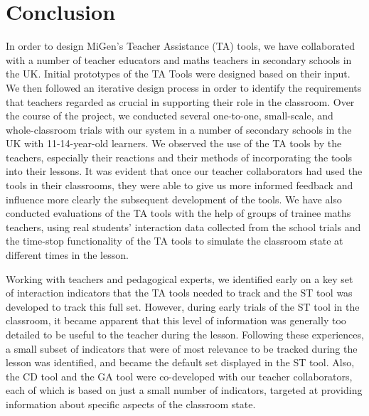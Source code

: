 \section{Conclusion}
\label{sec:conclusion}

In order to design MiGen’s Teacher Assistance (TA) tools, we have
collaborated with a number of teacher educators and maths teachers in
secondary schools in the UK. Initial prototypes of the TA Tools were
designed based on their input. We then followed an iterative design
process in order to identify the requirements that teachers regarded
as crucial in supporting their role in the classroom. Over the course
of the project, we conducted several one-to-one, small-scale, and
whole-classroom trials with our system in a number of secondary
schools in the UK with 11-14-year-old learners. We observed the use of
the TA tools by the teachers, especially their reactions and their
methods of incorporating the tools into their lessons. It was evident
that once our teacher collaborators had used the tools in their
classrooms, they were able to give us more informed feedback and
influence more clearly the subsequent development of the tools. We
have also conducted evaluations of the TA tools with the help of
groups of trainee maths teachers, using real students’ interaction
data collected from the school trials and the time-stop functionality
of the TA tools to simulate the classroom state at different times in
the lesson.

Working with teachers and pedagogical experts, we identified early on
a key set of interaction indicators that the TA tools needed to track
and the ST tool was developed to track this full set. However, during
early trials of the ST tool in the classroom, it became apparent that
this level of information was generally too detailed to be useful to
the teacher during the lesson. Following these experiences, a small
subset of indicators that were of most relevance to be tracked during
the lesson was identified, and became the default set displayed in the
ST tool. Also, the CD tool and the GA tool were co-developed with our
teacher collaborators, each of which is based on just a small number
of indicators, targeted at providing information about specific
aspects of the classroom state.

